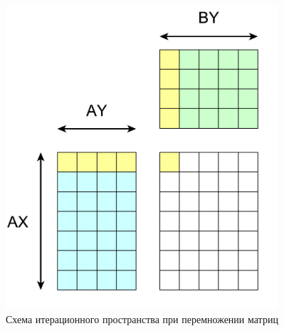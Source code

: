 \documentclass[a4paper,12pt,oneside]{article}
\begin{document}
\begin{figure}
\centering
\includegraphics[width=0.9\textwidth]{pictures/iter-space-matrix-single.pdf}
\caption{Схема итерационного пространства при перемножении матриц}
\label{fig:iterspace}
\end{figure}



\end{document}
